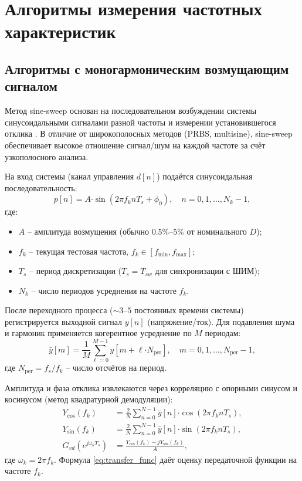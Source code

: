 \section{Алгоритмы измерения частотных характеристик}

\subsection{Алгоритмы с моногармоническим возмущающим сигналом}

Метод sine-sweep основан на последовательном возбуждении системы синусоидальными сигналами разной частоты и измерении установившегося отклика \cite{ridley2006frequency}. В отличие от широкополосных методов (PRBS, multisine), sine-sweep обеспечивает высокое отношение сигнал/шум на каждой частоте за счёт узкополосного анализа.

На вход системы (канал управления $d[n]$) подаётся синусоидальная последовательность:
\begin{equation}
    p[n] = A \mathord{\cdot} \sin\left(2\pi f_k n T_s + \phi_0\right), \quad n = 0,1,\dots,N_k-1,
    \label{eq:sine_pert}
\end{equation}
где:
\begin{itemize}
    \item $A$ -- амплитуда возмущения (обычно $0.5\%$--$5\%$ от номинального $D$);
    \item $f_k$ -- текущая тестовая частота, $f_k \in [f_{\min}, f_{\max}]$;
    \item $T_s$ -- период дискретизации ($T_s = T_{sw}$ для синхронизации с ШИМ);
    \item $N_k$ -- число периодов усреднения на частоте $f_k$.
\end{itemize}

После переходного процесса ($\sim 3$--$5$ постоянных времени системы) регистрируется выходной сигнал $y[n]$ (напряжение/ток). Для подавления шума и гармоник применяется когерентное усреднение по $M$ периодам:
\begin{equation}
    \bar{y}[m] = \frac{1}{M} \sum_{\ell=0}^{M-1} y\left[m + \ell \mathord{\cdot} N_{\text{per}}\right], 
    \quad m = 0,1,\dots,N_{\text{per}}-1,
    \label{eq:coherent_avg}
\end{equation}
где $N_{\text{per}} = f_s / f_k$ -- число отсчётов на период.

Амплитуда и фаза отклика извлекаются через корреляцию с опорными синусом и косинусом (метод квадратурной демодуляции):
\begin{align}
    Y_{\cos}(f_k) &= \frac{2}{N} \sum_{n=0}^{N-1} \bar{y}[n] \mathord{\cdot} \cos(2\pi f_k n T_s), \label{eq:demod_cos} \\
    Y_{\sin}(f_k) &= \frac{2}{N} \sum_{n=0}^{N-1} \bar{y}[n] \mathord{\cdot} \sin(2\pi f_k n T_s), \label{eq:demod_sin} \\
    G_{vd}(e^{j\omega_k T_s}) &= \frac{Y_{\cos}(f_k) - j Y_{\sin}(f_k)}{A}, \label{eq:transfer_func}
\end{align}
где $\omega_k = 2\pi f_k$. Формула \eqref{eq:transfer_func} даёт оценку передаточной функции на частоте $f_k$.

